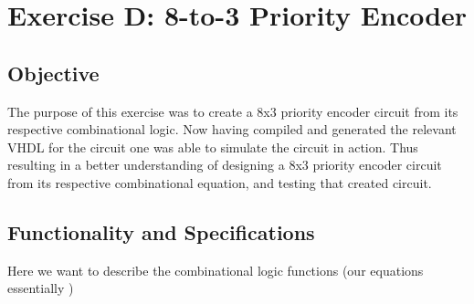 \documentclass[12pt]{article}
\begin{document}
\section{Exercise D: 8-to-3 Priority Encoder}
\subsection{Objective}
The purpose of this exercise was to create a 8x3 priority encoder circuit from its respective combinational logic. Now having compiled and generated the relevant VHDL for the circuit one was able to simulate the circuit in action. Thus resulting in a better understanding of designing a 8x3 priority encoder circuit from its respective combinational equation, and testing that created circuit.

\subsection{Functionality and Specifications}

Here we want to describe the combinational logic functions (our equations essentially )
\end{document}
